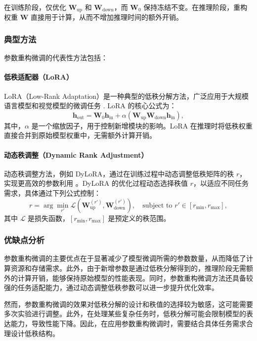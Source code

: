 \documentclass[12pt,a4paper,twoside]{article} %
\begin{document}
\begin{multicols}{2}
在训练阶段，仅优化 $\mathbf{W}_{\text{up}}$ 和 $\mathbf{W}_{\text{down}}$，而 $\mathbf{W}_0$ 保持冻结不变。在推理阶段，重构权重 $\mathbf{W}$ 直接用于计算，从而不增加推理时间的额外开销。

\subsubsection{典型方法}
参数重构微调的代表性方法包括：

\paragraph{低秩适配器（LoRA）}
LoRA（Low-Rank Adaptation）是一种典型的低秩分解方法，广泛应用于大规模语言模型和视觉模型的微调任务 \cite{lora}. LoRA 的核心公式为：
\begin{equation}
\mathbf{h}_{\text{out}} = \mathbf{W}_0 \mathbf{h}_{\text{in}} + \alpha (\mathbf{W}_{\text{up}} \mathbf{W}_{\text{down}} \mathbf{h}_{\text{in}}),
\end{equation}
其中，$\alpha$ 是一个缩放因子，用于控制新增模块的影响。LoRA 在推理时将低秩权重直接合并到原始模型权重中，无需额外计算开销。

\paragraph{动态秩调整（Dynamic Rank Adjustment）}
动态秩调整方法，例如 DyLoRA，通过在训练过程中动态调整低秩矩阵的秩 $r$，实现更高效的参数利用 \cite{dylora}。DyLoRA 的优化过程动态选择秩值 $r$，以适应不同任务需求，具体通过下列公式控制：
\begin{equation}
r = \arg\min_{r'} \mathcal{L}(\mathbf{W}_{\text{up}}^{(r')}, \mathbf{W}_{\text{down}}^{(r')}), \quad \text{subject to } r' \in [r_{\text{min}}, r_{\text{max}}],
\end{equation}
其中 $\mathcal{L}$ 是损失函数，$[r_{\text{min}}, r_{\text{max}}]$ 是预定义的秩范围。

\subsubsection{优缺点分析}
参数重构微调的主要优点在于显著减少了模型微调所需的参数数量，从而降低了计算资源和存储需求。此外，由于新增参数是通过低秩分解得到的，推理阶段无需额外的计算开销，能够保持原始模型的性能表现。同时，参数重构微调方法还具备较强的任务适配能力，通过动态调整低秩参数可以进一步提升优化效率。

然而，参数重构微调的效果对低秩分解的设计和秩值的选择较为敏感，这可能需要多次实验进行调整。此外，在处理某些复杂任务时，低秩分解可能会限制模型的表达能力，导致性能下降。因此，在应用参数重构微调时，需要结合具体任务需求合理设计低秩结构。


\end{multicols}
\end{document}
